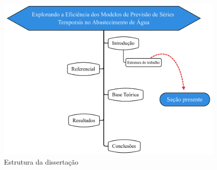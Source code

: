 \begin{figure}[H]
	\centering
	\caption{Estrutura da dissertação}
	\label{fig:estrutura}
	\includegraphics[width=1\linewidth]{Introducao/Figuras/Estrutura}
	
\end{figure}
